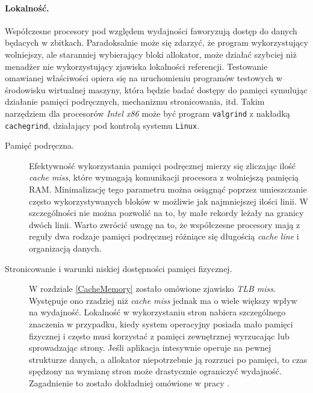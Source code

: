 \documentclass[12pt,a4paper,titlepage,twoside]{mwart}
\begin{document}
\paragraph{Lokalność.} Współczesne procesory pod względem wydajności faworyzują
dostęp do danych będacych w zbitkach. Paradoksalnie może się zdarzyć, że
program wykorzystujący wolniejszy, ale staranniej wybierający bloki allokator,
może działać szybciej niż menadżer nie wykorzystujący zjawiska lokalności
referencji. Testowanie omawianej właściwości opiera się na uruchomieniu
programów testowych w środowisku wirtualnej maszyny, która będzie badać dostępy
do pamięci symulując działanie pamięci podręcznych, mechanizmu stronicowania,
itd. Takim narzędziem dla procesorów \textit{Intel x86} może być program
\texttt{valgrind} z nakładką \texttt{cachegrind}, działający pod kontrolą
systemu \texttt{Linux}. 

\begin{description}

\item[Pamięć podręczna.] Efektywność wykorzystania pamięci podręcznej mierzy
się zliczając ilość \textit{cache miss}, które wymagają komunikacji procesora z
wolniejszą pamięcią RAM. Minimalizację tego parametru można osiągnąć poprzez
umieszczanie często wykorzystywanych bloków w możliwie jak najmniejszej ilości
linii. W szczególności nie można pozwolić na to, by małe rekordy leżały na
granicy dwóch linii. Warto zwrócić uwagę na to, że współczesne procesory mają z
reguły dwa rodzaje pamięci podręcznej różniące się długością \textit{cache line} i
organizacją danych.

\vspace{1ex}

\item[Stronicowanie i warunki niskiej dostępności pamięci fizycznej.] W
rozdziale \ref{CacheMemory} zostało omówione zjawisko \textit{TLB miss}.
Występuje ono rzadziej niż \textit{cache miss} jednak ma o wiele większy wpływ
na wydajność. Lokalność w wykorzystaniu stron nabiera szczególnego znaczenia w
przypadku, kiedy system operacyjny posiada mało pamięci fizycznej i często musi
korzystać z pamięci zewnętrznej wyrzucając lub sprowadzając strony. Jeśli
aplikacja intesywnie operuje na pewnej strukturze danych, a allokator
niepotrzebnie ją rozrzuci po pamięci, to czas spędzony na wymianę stron może
drastycznie ograniczyć wydajność. Zagadnienie to zostało dokładniej omówione w
pracy \cite{feng05localityimproving}.

\end{description}
\end{document}
